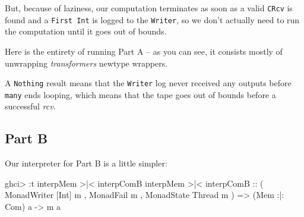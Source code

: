 \documentclass[]{article}
\newenvironment{Shaded}{}{}
\newcommand{\CommentTok}[1]{\textcolor[rgb]{0.38,0.63,0.69}{\textit{#1}}}
\newcommand{\DataTypeTok}[1]{\textcolor[rgb]{0.56,0.13,0.00}{#1}}
\newcommand{\FunctionTok}[1]{\textcolor[rgb]{0.02,0.16,0.49}{#1}}
\newcommand{\NormalTok}[1]{#1}
\newcommand{\OtherTok}[1]{\textcolor[rgb]{0.00,0.44,0.13}{#1}}
\begin{document}
But, because of laziness, our computation terminates as soon as a valid
\texttt{CRcv} is found and a \texttt{First\ Int} is logged to the
\texttt{Writer}, so we don't actually need to run the computation until it goes
out of bounds.

Here is the entirety of running Part A -- as you can see, it consists mostly of
unwrapping \emph{transformers} newtype wrappers.

\begin{Shaded}
\end{Shaded}

A \texttt{Nothing} result means that the \texttt{Writer} log never received any
outputs before \texttt{many} ends looping, which means that the tape goes out of
bounds before a successful \emph{rcv}.

\hypertarget{part-b}{%
\subsection{Part B}\label{part-b}}

Our interpreter for Part B is a little simpler:

\begin{Shaded}
\begin{Highlighting}[]
\NormalTok{ghci}\FunctionTok{>} \FunctionTok{:}\NormalTok{t interpMem }\FunctionTok{>|<}\NormalTok{ interpComB}
\NormalTok{interpMem }\FunctionTok{>|<}\NormalTok{ interpComB}
\OtherTok{    ::}\NormalTok{ ( }\DataTypeTok{MonadWriter}\NormalTok{ [}\DataTypeTok{Int}\NormalTok{] m}
\NormalTok{       , }\DataTypeTok{MonadFail}\NormalTok{ m}
\NormalTok{       , }\DataTypeTok{MonadState} \DataTypeTok{Thread}\NormalTok{ m}
\NormalTok{       )}
    \OtherTok{=>}\NormalTok{ (}\DataTypeTok{Mem} \FunctionTok{:|:} \DataTypeTok{Com}\NormalTok{) a}
    \OtherTok{->}\NormalTok{ m a}
\end{Highlighting}
\end{Shaded}
\end{document}
